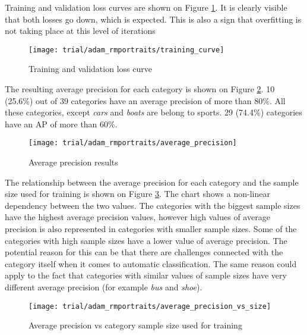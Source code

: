     Training and validation loss curves are shown on Figure \ref{fig:trial-training-curve}. It is clearly visible that both losses go down, which is expected. This is also a sign that overfitting is not taking place at this level of iterations
    
    \begin{figure}[H]
        \centering
        \texttt{[image: trial/adam\_rmportraits/training\_curve]}
        \caption[Trial experiment. Training and validation loss curve]{Training and validation loss curve}
        \label{fig:trial-training-curve}
    \end{figure}
    
    The resulting average precision for each category is shown on Figure \ref{fig:trial-average-precision}. 10 (25.6\%) out of 39 categories have an average precision of more than 80\%. All these categories, except \textit{cars} and \textit{boats} are belong to sports. 29 (74.4\%) categories have an AP of more than 60\%.

    \begin{figure}[H]
        \centering
        \texttt{[image: trial/adam\_rmportraits/average\_precision]}
        \caption[Trial experiment. Average precision results]{Average precision results}
        \label{fig:trial-average-precision}
    \end{figure}
    
    The relationship between the average precision for each category and the sample size used for training is shown on Figure \ref{fig:trial-average-precision-vs-size}. The chart shows a non-linear dependency between the two values. The categories with the biggest sample sizes have the highest average precision values, however high values of average precision is also represented in categories with smaller sample sizes. Some of the categories with high sample sizes have a lower value of average precision. The potential reason for this can be that there are challenges connected with the category itself when it comes to automatic classification. The same reason could apply to the fact that categories with similar values of sample sizes have very different average precision (for example \textit{bus} and \textit{shoe}).
    
    \begin{figure}[H]
        \centering
        \texttt{[image: trial/adam\_rmportraits/average\_precision\_vs\_size]}
        \caption[Trial experiment. Average precision vs category sample size used for training]{Average precision vs category sample size used for training}
        \label{fig:trial-average-precision-vs-size}
    \end{figure}
    

